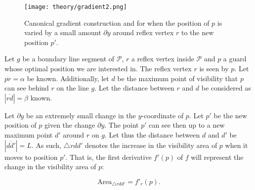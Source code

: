\begin{figure}[h!]
    \centering
    \texttt{[image: theory/gradient2.png]}
    \caption{Canonical gradient construction and for when the position of $p$ is varied by a small amount $\partial y$ around reflex vertex $r$ to the new position $p'$.}
    \label{fig:gradient}
\end{figure}

Let $g$ be a boundary line segment of $\mathcal P$, $r$ a reflex vertex inside $\mathcal P$ and $p$ a guard whose optimal position we are interested in. The reflex vertex $r$ is seen by $p$. Let $\overline{pr} = \alpha$ be known. Additionally, let $d$ be the maximum point of visibility that $p$ can see behind $r$ on the line $g$. Let the distance between $r$ and $d$ be considered as $|\overline{rd}| = \beta$ known. 



Let $\partial y$ be an extremely small change in the $y$-coordinate of $p$. Let $p'$ be the new position of $p$ given the change $\partial y$. The point $p'$ can see then up to a new maximum point $d'$ around $r$ on $g$. Let thus the distance between $d$ and $d'$ be $|\overline{dd'}| = L$. As such, $\triangle rdd'$ denotes the increase in the visibility area of $p$ when it moves to position $p'$. That is, the first derivative $f'(p)$ of $f$ will represent the change in the visibility area of $p$:

\begin{equation}
    \text{Area}_{\triangle rdd'} = f'_r(p). \label{eq:derivative}
\end{equation}







